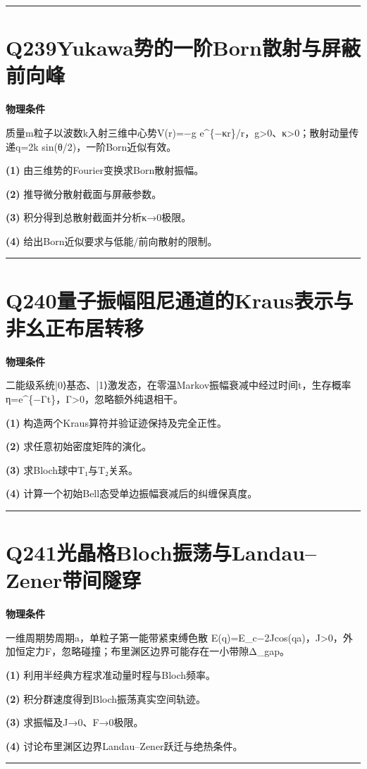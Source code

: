 \documentclass[UTF8,a4paper,11pt,oneside,openany]{ctexbook}
\begin{document}
\par\bigskip\hrule\bigskip
\section*{Q239\quad Yukawa势的一阶Born散射与屏蔽前向峰}
\textbf{物理条件}\par 质量m粒子以波数k入射三维中心势V(r)=−g e\textasciicircum{}\{−κr\}/r，g>0、κ>0；散射动量传递q=2k sin(θ/2)，一阶Born近似有效。
\par\noindent\textbf{(1)} 由三维势的Fourier变换求Born散射振幅。
\par\noindent\textbf{(2)} 推导微分散射截面与屏蔽参数。
\par\noindent\textbf{(3)} 积分得到总散射截面并分析κ→0极限。
\par\noindent\textbf{(4)} 给出Born近似要求与低能/前向散射的限制。

\par\bigskip\hrule\bigskip
\section*{Q240\quad 量子振幅阻尼通道的Kraus表示与非幺正布居转移}
\textbf{物理条件}\par 二能级系统|0⟩基态、|1⟩激发态，在零温Markov振幅衰减中经过时间t，生存概率η=e\textasciicircum{}\{−Γt\}，Γ>0，忽略额外纯退相干。
\par\noindent\textbf{(1)} 构造两个Kraus算符并验证迹保持及完全正性。
\par\noindent\textbf{(2)} 求任意初始密度矩阵的演化。
\par\noindent\textbf{(3)} 求Bloch球中T₁与T₂关系。
\par\noindent\textbf{(4)} 计算一个初始Bell态受单边振幅衰减后的纠缠保真度。

\par\bigskip\hrule\bigskip
\section*{Q241\quad 光晶格Bloch振荡与Landau–Zener带间隧穿}
\textbf{物理条件}\par 一维周期势周期a，单粒子第一能带紧束缚色散 E(q)=E\_c−2Jcos(qa)，J>0，外加恒定力F，忽略碰撞；布里渊区边界可能存在一小带隙Δ\_gap。
\par\noindent\textbf{(1)} 利用半经典方程求准动量时程与Bloch频率。
\par\noindent\textbf{(2)} 积分群速度得到Bloch振荡真实空间轨迹。
\par\noindent\textbf{(3)} 求振幅及J→0、F→0极限。
\par\noindent\textbf{(4)} 讨论布里渊区边界Landau–Zener跃迁与绝热条件。

\par\bigskip\hrule\bigskip
\end{document}
